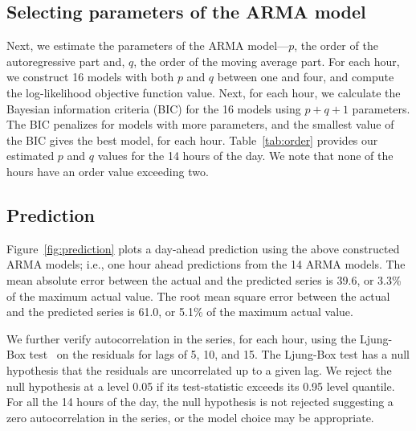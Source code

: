 \documentclass[review]{elsarticle}
\begin{document}
\subsection{Selecting parameters of the ARMA model}
Next, we estimate the parameters of the ARMA model---$p$, the order of the 
autoregressive part and, $q$, the order of the moving average part. For each 
hour, we construct 16 models with both $p$ and $q$ between one and four, and 
compute 
the log-likelihood objective function value. Next, for each hour, we calculate 
the Bayesian information criteria (BIC) for the 16 models using $p + q + 1$ 
parameters.  The BIC penalizes for models with more parameters, and the 
smallest value of the BIC gives the best model, for each 
hour. Table~\ref{tab:order} provides our estimated $p$ and $q$  values for 
the 14 hours of the day. We note that none of the hours have an order value 
exceeding two.

\begin{table}[!htb]
\centering
\caption{Estimated $p$ and $q$ values for ARMA($p,q$) models for 14 hours of 
the day}
\label{tab:order}
\end{table}

\subsection{Prediction}

Figure~\ref{fig:prediction} plots a day-ahead prediction using the above 
constructed ARMA models; i.e., one hour ahead predictions from the 14 ARMA 
models. The mean absolute error between the actual and the predicted series is 
39.6, or  3.3\% of the maximum actual value. The root mean square 
error between the actual and the predicted series is 
61.0, or  5.1\% of the maximum actual value. 

We further verify autocorrelation in the series, for each hour, using the 
Ljung-Box test~\cite{ljung1978measure} on the residuals for lags of 5, 10, 
and 15. The Ljung-Box  test has a 
null hypothesis that the residuals are uncorrelated up to a 
given lag. We reject the null hypothesis at a level 0.05 if its test-statistic 
exceeds its 
0.95 level quantile. For all the 14 hours of the day, the null hypothesis is not
rejected suggesting a zero autocorrelation in the series, or the 
model choice may be appropriate. 
\end{document}

